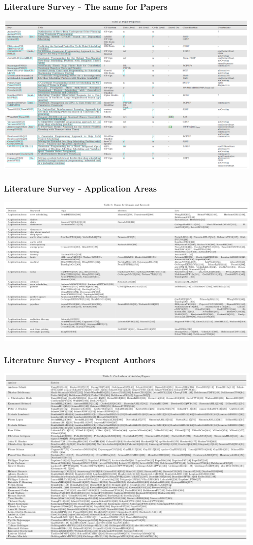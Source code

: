 \documentclass[dvipsnames,aspectratio=169]{beamer}
\begin{document}
\begin{frame}
\frametitle{Literature Survey - The same for Papers}
\includegraphics[width=\textwidth]{images/papers2}
\end{frame}

\begin{frame}
\frametitle{Literature Survey - Application Areas}
\includegraphics[width=.9\textwidth]{images/applicationareas}
\end{frame}

\begin{frame}
\frametitle{Literature Survey - Frequent Authors}
\includegraphics[width=.74\textwidth]{images/authors}
\end{frame}
\end{document}
